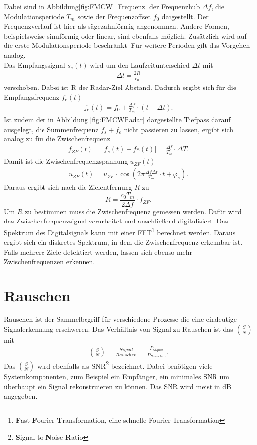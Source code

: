 Dabei sind in Abbildung\ref{fig:FMCW_Frequenz} der Frequenzhub $\Delta f$, die Modulationsperiode $T_{m}$ sowie der Frequenzoffset $f_{0}$ dargestellt. Der Frequenzverlauf ist hier als sägezahnförmig angenommen. Andere Formen, beispielsweise sinuförmig oder linear, sind ebenfalls möglich. Zusätzlich wird auf die erste Modulationsperiode beschränkt. Für weitere Perioden gilt das Vorgehen analog.\\
Das Empfangssignal $s_{e}(t)$ wird um den Laufzeitunterschied $\Delta t$ mit
\begin{align}
\Delta t = \frac{2R}{c_{0}}
\end{align}
verschoben. Dabei ist R der Radar-Ziel Abstand. Dadurch ergibt sich für die Empfangsfrequenz $f_{e}(t)$ 
\begin{align}
f_{e}(t) = f_{0} + \frac{\Delta f}{T_{m}}\cdot \left( t-\Delta t \right).
\end{align}
Ist zudem der in Abbildung \ref{fig:FMCWRadar} dargestellte Tiefpass darauf ausgelegt, die Summenfrequenz $f_{s} + f_{e}$ nicht passieren zu lassen, ergibt sich analog zu \cite[S.43,S.44]{HuderRadar} für die Zwischenfrequenz
\begin{align}
f_{ZF}(t) = \vert f_{s}(t)- f{e}(t) \vert = \frac{\Delta f}{T_{m}}\cdot \Delta T.
\end{align}
Damit ist die Zwischenfrequenzspannung $u_{ZF}(t)$ 
\begin{align}
u_{ZF}(t) = u_{ZF} \cdot  \cos\left( 2\pi \frac{\Delta f \Delta t}{T_{m}} \cdot t + \varphi_{s} \right) .
\end{align}
Daraus ergibt sich nach\cite[S.80]{HuderRadar} die Zielentfernung $R$ zu
\begin{equation}
R = \frac{c_{0}T_{m}}{2\Delta f}\cdot f_{ZF}.
\end{equation}
Um $R$ zu bestimmen muss die Zwischenfrequenz gemessen werden. Dafür wird das Zwischenfrequenzsignal verarbeitet und anschließend digitalisiert. Das Spektrum des Digitalsignals kann mit einer FFT\footnote{\textbf{F}ast \textbf{F}ourier \textbf{T}ransformation, eine schnelle Fourier Transformation} berechnet werden. Daraus ergibt sich ein diskretes Spektrum, in dem die Zwischenfrequenz erkennbar ist. Falls mehrere Ziele detektiert werden, lassen sich ebenso mehr Zwischenfrequenzen erkennen.
\section{Rauschen}
Rauschen ist der Sammelbegriff für verschiedene Prozesse die eine eindeutige Signalerkennung erschweren. Das Verhältnis von Signal zu Rauschen ist das $\left( \frac{S}{N}\right)$ mit
\begin{align}
\left( \frac{S}{N}\right) =\frac{Signal}{Rauschen} =  \frac{P_{Signal}}{P_{Rauschen}}.
\end{align}
Das $\left( \frac{S}{N}\right)$ wird ebenfalls als SNR\footnote{\textbf{S}ignal to \textbf{N}oise \textbf{R}atio} bezeichnet. Dabei benötigen viele Systemkomponenten, zum Beispiel ein Empfänger, ein minimales SNR um überhaupt ein Signal rekonstruieren zu können. Das SNR wird meist in dB angegeben.
